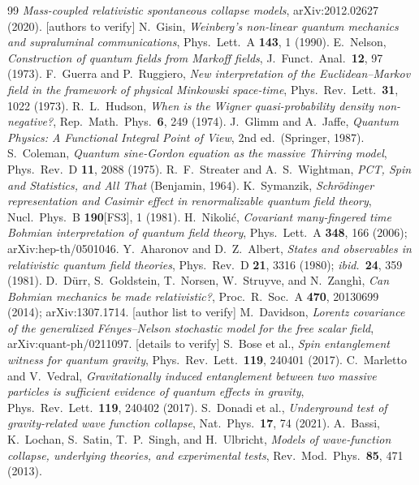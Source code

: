 \documentclass[aps,prd,preprint,amsmath,amssymb,nofootinbib,superscriptaddress]{revtex4-2}
\begin{document}
\begin{thebibliography}{99}
 \textit{Mass-coupled relativistic spontaneous collapse models}, arXiv:2012.02627 (2020). [authors to verify]
 N.~Gisin, \textit{Weinberg's non-linear quantum mechanics and supraluminal communications}, Phys.\ Lett.\ A \textbf{143}, 1 (1990).
 E.~Nelson, \textit{Construction of quantum fields from Markoff fields}, J.\ Funct.\ Anal.\ \textbf{12}, 97 (1973).
 F.~Guerra and P.~Ruggiero, \textit{New interpretation of the Euclidean--Markov field in the framework of physical Minkowski space-time}, Phys.\ Rev.\ Lett.\ \textbf{31}, 1022 (1973).
 R.~L.~Hudson, \textit{When is the Wigner quasi-probability density non-negative?}, Rep.\ Math.\ Phys.\ \textbf{6}, 249 (1974).
 J.~Glimm and A.~Jaffe, \textit{Quantum Physics: A Functional Integral Point of View}, 2nd ed.\ (Springer, 1987).
 S.~Coleman, \textit{Quantum sine-Gordon equation as the massive Thirring model}, Phys.\ Rev.\ D \textbf{11}, 2088 (1975).
 R.~F.~Streater and A.~S.~Wightman, \textit{PCT, Spin and Statistics, and All That} (Benjamin, 1964).
 K.~Symanzik, \textit{Schr\"odinger representation and Casimir effect in renormalizable quantum field theory}, Nucl.\ Phys.\ B \textbf{190}[FS3], 1 (1981).
 H.~Nikoli\'c, \textit{Covariant many-fingered time Bohmian interpretation of quantum field theory}, Phys.\ Lett.\ A \textbf{348}, 166 (2006); arXiv:hep-th/0501046.
 Y.~Aharonov and D.~Z.~Albert, \textit{States and observables in relativistic quantum field theories}, Phys.\ Rev.\ D \textbf{21}, 3316 (1980); \textit{ibid.}\ \textbf{24}, 359 (1981).
 D.~D\"urr, S.~Goldstein, T.~Norsen, W.~Struyve, and N.~Zangh\`i, \textit{Can Bohmian mechanics be made relativistic?}, Proc.\ R.\ Soc.\ A \textbf{470}, 20130699 (2014); arXiv:1307.1714. [author list to verify]
 M.~Davidson, \textit{Lorentz covariance of the generalized F\'enyes--Nelson stochastic model for the free scalar field}, arXiv:quant-ph/0211097. [details to verify]
 S.~Bose et al., \textit{Spin entanglement witness for quantum gravity}, Phys.\ Rev.\ Lett.\ \textbf{119}, 240401 (2017).
 C.~Marletto and V.~Vedral, \textit{Gravitationally induced entanglement between two massive particles is sufficient evidence of quantum effects in gravity}, Phys.\ Rev.\ Lett.\ \textbf{119}, 240402 (2017).
 S.~Donadi et al., \textit{Underground test of gravity-related wave function collapse}, Nat.\ Phys.\ \textbf{17}, 74 (2021).
 A.~Bassi, K.~Lochan, S.~Satin, T.~P.~Singh, and H.~Ulbricht, \textit{Models of wave-function collapse, underlying theories, and experimental tests}, Rev.\ Mod.\ Phys.\ \textbf{85}, 471 (2013).

\end{thebibliography}
\end{document}
